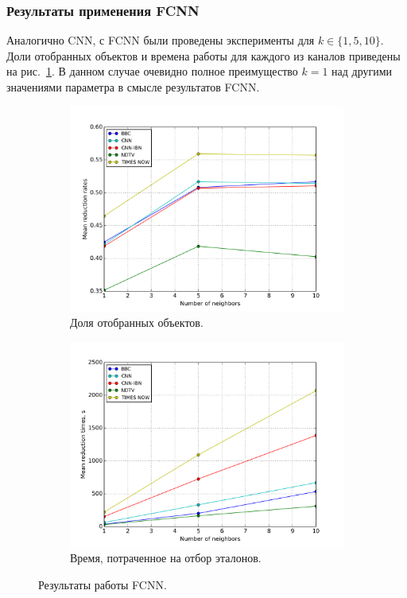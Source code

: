 \subsubsection*{Результаты применения FCNN}
Аналогично CNN, с FCNN были проведены эксперименты для \(k\in\{1,5,10\}\). Доли отобранных объектов и времена работы для каждого из каналов приведены на рис.~\ref{fig:fcnn-stats}. В данном случае очевидно полное преимущество \(k=1\) над другими значениями параметра в смысле результатов FCNN.
\begin{figure}[h!]
    \centering
	\begin{subfigure}{0.45\textwidth}
		\includegraphics[width=\textwidth]{images/fcnn-stats.png}
		\caption{Доля отобранных объектов.}
	\end{subfigure}
	\begin{subfigure}{0.45\textwidth}
		\includegraphics[width=\textwidth]{images/fcnn-TimeStats.png}
		\caption{Время, потраченное на отбор эталонов.}
	\end{subfigure}
	\caption{Результаты работы FCNN.}\label{fig:fcnn-stats}
\end{figure}

